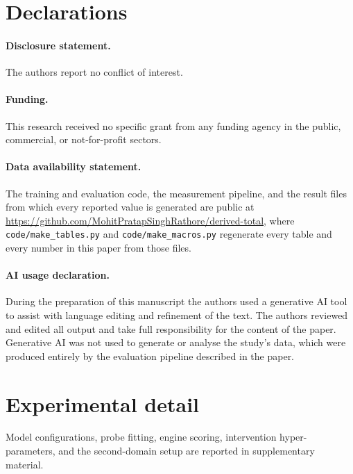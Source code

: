 \documentclass[11pt]{article}
\theoremstyle{remark}
\newif\ifanon
\begin{document}
\section*{Declarations}

\paragraph{Disclosure statement.}
\ifanon
Removed for double-anonymous peer review.
\else
The authors report no conflict of interest.
\fi

\paragraph{Funding.}
\ifanon
Removed for double-anonymous peer review.
\else
This research received no specific grant from any funding agency in the public,
commercial, or not-for-profit sectors.
\fi

\paragraph{Data availability statement.}
\ifanon
The code and evaluation artifacts will be made available upon acceptance.
\else
The training and evaluation code, the measurement pipeline, and the result files
from which every reported value is generated are public at
\url{https://github.com/MohitPratapSinghRathore/derived-total}, where
\texttt{code/make\_tables.py} and \texttt{code/make\_macros.py} regenerate every
table and every number in this paper from those files.
\fi

\paragraph{AI usage declaration.}
During the preparation of this manuscript the authors used a generative AI tool
to assist with language editing and refinement of the text. The authors reviewed
and edited all output and take full responsibility for the content of the paper.
Generative AI was not used to generate or analyse the study's data, which were
produced entirely by the evaluation pipeline described in the paper.


\appendix

\section{Experimental detail}

Model configurations, probe fitting, engine scoring, intervention hyper-parameters, and the second-domain setup are reported in supplementary material.
\end{document}
